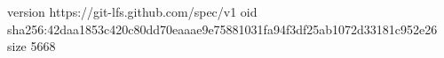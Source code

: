 version https://git-lfs.github.com/spec/v1
oid sha256:42daa1853c420c80dd70eaaae9e75881031fa94f3df25ab1072d33181c952e26
size 5668
